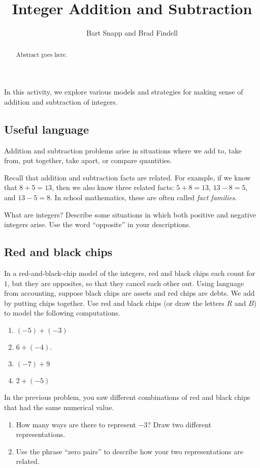 \documentclass{ximera}
\title{Integer Addition and Subtraction}
\author{Bart Snapp and Brad Findell}
\begin{document}
\begin{abstract}
Abstract goes here.  
\end{abstract}
\maketitle

\label{A:integerAddition}
In this activity, we explore various models and strategies for 
making sense of addition and subtraction of integers.  

\subsection*{Useful language}
Addition and subtraction problems arise in situations where we add to, take from, put together, 
take apart, or compare quantities.  

Recall that addition and subtraction facts are related.  For example, if we know that $8+5 = 13$, 
then we also know three related facts:  $5+8=13$, $13-8=5$, and $13-5=8$.  In school mathematics, 
these are often called \emph{fact families}.  

\begin{problem}
What are integers?  Describe some situations in which both positive and negative integers arise.  Use the word ``opposite'' in your descriptions.  
\end{problem}

\subsection*{Red and black chips}
\begin{problem}
In a red-and-black-chip model of the integers, red and black chips each count for $1$, but they are opposites, so that they cancel each other out.  Using language from accounting, suppose black chips are assets and red chips are debts.  We add by putting chips together.  Use red and black chips (or draw the letters $R$ and $B$) to model the following computations.
\begin{enumerate}
\item $(-5)+(-3)$
\item $6+(-4)$.
\item $(-7)+9$
\item $2+(-5)$
\end{enumerate}
\end{problem}

\begin{problem}
In the previous problem, you saw different combinations of red and black chips that had the same numerical value.  
\begin{enumerate}
\item How many ways are there to represent $-3$?  Draw two different representations. 
\item Use the phrase ``zero pairs'' to describe how your two representations are related.  
\end{enumerate}
\end{problem}
\end{document}
